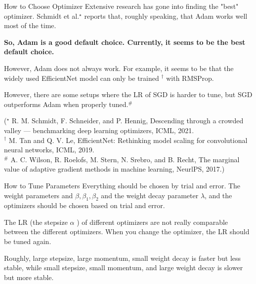 \begin{frame}[allowframebreaks]

\begin{myconceptblock}{6.24}{How to Choose Optimizer}
    Extensive research has gone into finding the "best" optimizer. Schmidt et al.${ }^{\star}$ reports that, roughly speaking, that Adam works well most of the time.

    \textbf{So, Adam is a good default choice. Currently, it seems to be the best default choice.}

    However, Adam does not always work. For example, it seems to be that the widely used EfficientNet model can only be trained ${ }^{\dagger}$ with RMSProp.

    However, there are some setups where the LR of SGD is harder to tune, but SGD outperforms Adam when properly tuned.${ }^{\#}$

    (${ }^{\star}$ R. M. Schmidt, F. Schneider, and P. Hennig, Descending through a crowded valley — benchmarking deep learning optimizers, ICML, 2021.\\
    ${ }^{\dagger}$ M. Tan and Q. V. Le, EfficientNet: Rethinking model scaling for convolutional neural networks, ICML, 2019.\\
    ${ }^{\#}$ A. C. Wilson, R. Roelofs, M. Stern, N. Srebro, and B. Recht, The marginal value of adaptive gradient methods in machine learning, NeurlPS, 2017.)
\end{myconceptblock}

\end{frame}

\begin{frame}[allowframebreaks]

\begin{myconceptblock}{6.25}{How to Tune Parameters}
    Everything should be chosen by trial and error. The weight parameters and $\beta, \beta_{1}, \beta_{2}$ and the weight decay parameter $\lambda$, and the optimizers should be chosen based on trial and error.

    The LR (the stepsize $\alpha$ ) of different optimizers are not really comparable between the different optimizers. When you change the optimizer, the LR should be tuned again.

    Roughly, large stepsize, large momentum, small weight decay is faster but less stable, while small stepsize, small momentum, and large weight decay is slower but more stable.
\end{myconceptblock}

\end{frame}

